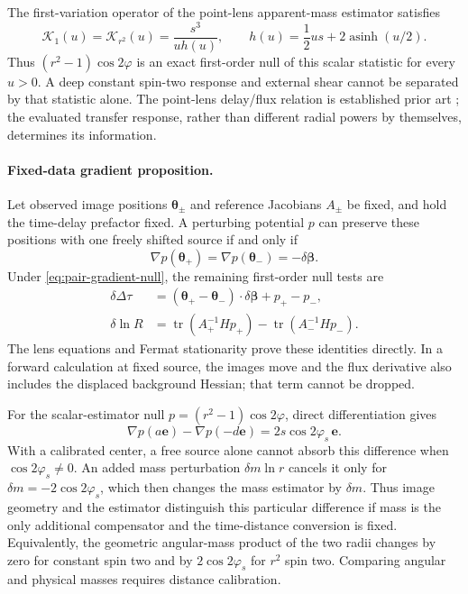The first-variation operator of the point-lens apparent-mass estimator satisfies
\begin{equation}
 \mathcal K_{1}(u)=\mathcal K_{r^2}(u)
 =\frac{s^3}{u h(u)},\qquad
 h(u)=\frac12us+2\operatorname{asinh}(u/2).
\end{equation}
Thus $(r^2-1)\cos2\varphi$ is an exact first-order null of this scalar statistic for every $u>0$. A deep constant spin-two response and external shear cannot be separated by that statistic alone. The point-lens delay/flux relation is established prior art \cite{Munoz2016}; the evaluated transfer response, rather than different radial powers by themselves, determines its information.

\paragraph{Fixed-data gradient proposition.}
Let observed image positions $\boldsymbol\theta_\pm$ and reference Jacobians $A_\pm$ be fixed, and hold the time-delay prefactor fixed. A perturbing potential $p$ can preserve these positions with one freely shifted source if and only if
\begin{equation}
 \nabla p(\boldsymbol\theta_+)=\nabla p(\boldsymbol\theta_-)
 =-\delta\boldsymbol\beta.\label{eq:pair-gradient-null}
\end{equation}
Under \eqref{eq:pair-gradient-null}, the remaining first-order null tests are
\begin{align}
 \delta\Delta\tau&=(\boldsymbol\theta_+-\boldsymbol\theta_-)
 \cdot\delta\boldsymbol\beta+p_+-p_-,\\
 \delta\ln R&=\operatorname{tr}(A_+^{-1}H p_+)
 -\operatorname{tr}(A_-^{-1}H p_-).
\end{align}
The lens equations and Fermat stationarity prove these identities directly. In a forward calculation at fixed source, the images move and the flux derivative also includes the displaced background Hessian; that term cannot be dropped.

For the scalar-estimator null $p=(r^2-1)\cos2\varphi$, direct differentiation gives
\begin{equation}
 \nabla p(a\mathbf e)-\nabla p(-d\mathbf e)
 =2s\cos2\varphi_s\,\mathbf e.
\end{equation}
With a calibrated center, a free source alone cannot absorb this difference when $\cos2\varphi_s\ne0$. An added mass perturbation $\delta m\ln r$ cancels it only for $\delta m=-2\cos2\varphi_s$, which then changes the mass estimator by $\delta m$. Thus image geometry and the estimator distinguish this particular difference if mass is the only additional compensator and the time-distance conversion is fixed. Equivalently, the geometric angular-mass product of the two radii changes by zero for constant spin two and by $2\cos2\varphi_s$ for $r^2$ spin two. Comparing angular and physical masses requires distance calibration.

